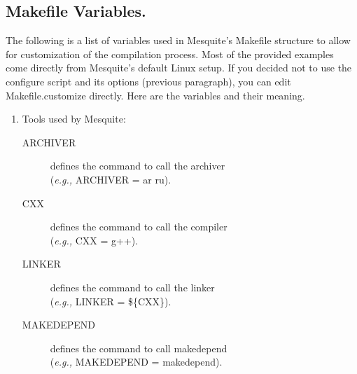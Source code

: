 \documentclass[letter]{report}
\begin{document}
\subsection{Makefile Variables.}  \label{mes_vars_and_defs}

The following is a list of variables used in Mesquite's Makefile
structure to allow for customization of the compilation process.
Most of the provided examples come directly from Mesquite's default
Linux setup. If you decided not to use the configure script and its options (previous paragraph),
you can edit Makefile.customize directly. Here are the variables and their meaning.
\begin{enumerate}

\item Tools used by Mesquite:
  \begin{description}
  \item[ARCHIVER] defines the command to call the archiver\\
    	({\it e.g.,} ARCHIVER = ar ru).
  \item[CXX] defines the command to call the compiler\\
	({\it e.g.,} CXX = g++).
  \item [LINKER] defines the command to call the linker\\
	({\it e.g.,} LINKER = \$\{CXX\}).
  \item[MAKEDEPEND] defines the command to call makedepend\\
	({\it e.g.,} MAKEDEPEND = makedepend).
  \end{description}


\end{enumerate}
\end{document}
